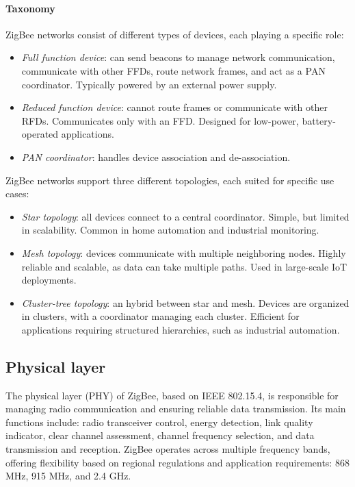 \paragraph*{Taxonomy}
ZigBee networks consist of different types of devices, each playing a specific role:
\begin{itemize}
    \item \textit{Full function device}: can send beacons to manage network communication, communicate with other FFDs, route network frames, and act as a PAN coordinator. 
        Typically powered by an external power supply.
    \item \textit{Reduced function device}: cannot route frames or communicate with other RFDs.
        Communicates only with an FFD.
        Designed for low-power, battery-operated applications.
    \item \textit{PAN coordinator}: handles device association and de-association.
\end{itemize}
\noindent ZigBee networks support three different topologies, each suited for specific use cases:
\begin{itemize}
    \item \textit{Star topology}: all devices connect to a central coordinator.
        Simple, but limited in scalability.
        Common in home automation and industrial monitoring.
    \item \textit{Mesh topology}: devices communicate with multiple neighboring nodes.
        Highly reliable and scalable, as data can take multiple paths.
        Used in large-scale IoT deployments.
    \item \textit{Cluster-tree topology}: an hybrid between star and mesh.
        Devices are organized in clusters, with a coordinator managing each cluster.
        Efficient for applications requiring structured hierarchies, such as industrial automation.
\end{itemize}

\subsection{Physical layer}
The physical layer (PHY) of ZigBee, based on IEEE 802.15.4, is responsible for managing radio communication and ensuring reliable data transmission. 
Its main functions include: radio transceiver control, energy detection, link quality indicator, clear channel assessment, channel frequency selection, and data transmission and reception.
ZigBee operates across multiple frequency bands, offering flexibility based on regional regulations and application requirements: 868 MHz, 915 MHz, and 2.4 GHz. 

